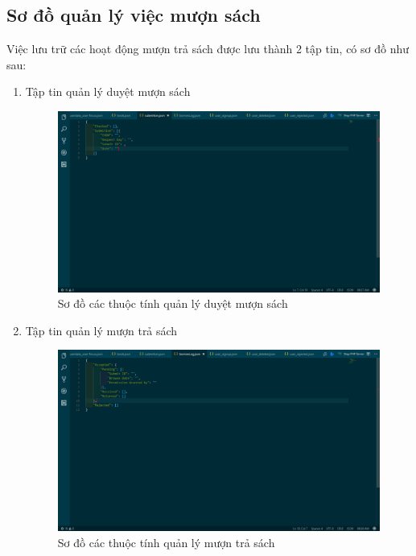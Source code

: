 \documentclass[12pt,a4paper]{report}
\begin{document}
		\subsection{Sơ đồ quản lý việc mượn sách}
		Việc lưu trữ các hoạt động mượn trả sách được lưu thành 2 tập tin, có sơ đồ như sau:
			\begin{enumerate}
				\item Tập tin quản lý duyệt mượn sách
				\begin{figure}[H]
				\centering

				\label{F:submition}
				\includegraphics[scale = .3]{submition.png}
				\caption{Sơ đồ các thuộc tính quản lý duyệt mượn sách}
			\end{figure}
				\item Tập tin quản lý mượn trả sách
				\begin{figure}[H]
				\centering

				\label{F:borrowLog}
				\includegraphics[scale = .3]{borrowlog.png}
				\caption{Sơ đồ các thuộc tính quản lý mượn trả sách}
			\end{figure}
			\end{enumerate}
\end{document}
